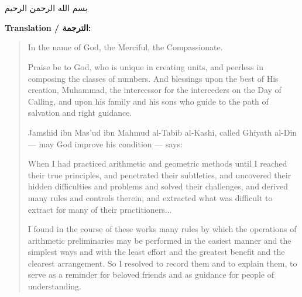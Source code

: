 \documentclass[11pt,a4paper]{book}
\newcommand{\arHuge}[1]{{\Huge\arabicfont\beginR #1\endR}}
\newenvironment{arabicbox}{%
  \begin{framed}
  \begin{minipage}{\linewidth-2\fboxsep-2\fboxrule}
  \setlength{\parindent}{0pt}
  \linespread{1.3}\selectfont
}{%
  \end{minipage}
  \end{framed}
}
\begin{document}
\chapter*{}

\begin{arabicbox}
\begin{center}
\arHuge{بسم الله الرحمن الرحيم}
\end{center}

\vspace{0.5cm}


\vspace{0.5cm}


\vspace{0.5cm}

\end{arabicbox}

\vspace{0.5cm}

\noindent\textbf{Translation / الترجمة:}

\begin{quote}
In the name of God, the Merciful, the Compassionate.

Praise be to God, who is unique in creating units, and peerless in composing the classes of numbers. And blessings upon the best of His creation, Muhammad, the intercessor for the interceders on the Day of Calling, and upon his family and his sons who guide to the path of salvation and right guidance.

Jamshid ibn Mas'ud ibn Mahmud al-Tabib al-Kashi, called Ghiyath al-Din --- may God improve his condition --- says:

When I had practiced arithmetic and geometric methods until I reached their true principles, and penetrated their subtleties, and uncovered their hidden difficulties and problems and solved their challenges, and derived many rules and controls therein, and extracted what was difficult to extract for many of their practitioners...

I found in the course of these works many rules by which the operations of arithmetic preliminaries may be performed in the easiest manner and the simplest ways and with the least effort and the greatest benefit and the clearest arrangement. So I resolved to record them and to explain them, to serve as a reminder for beloved friends and as guidance for people of understanding.
\end{quote}
\clearpage
\end{document}
